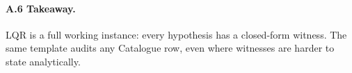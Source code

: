 \documentclass[conference]{IEEEtran}
\def\SHAREDLATEX{../../latex}
\begin{document}
\paragraph{A.6 Takeaway.}
LQR is a full working instance: every hypothesis has a closed-form
witness.  The same template audits any Catalogue row, even where
witnesses are harder to state analytically.



\end{document}
